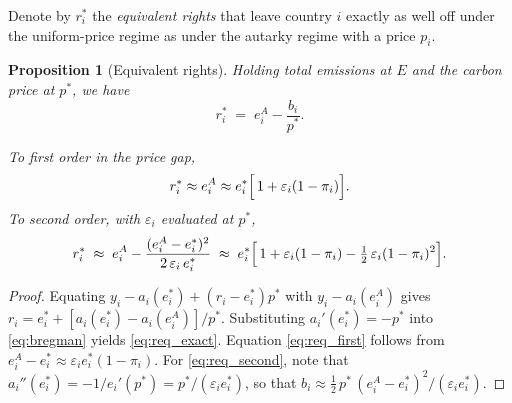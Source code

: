\documentclass[12pt,english]{article}
\newtheorem{proposition}{Proposition}
\theoremstyle{remark}
\begin{document}
Denote by $r^*_i$ the \textit{equivalent rights} that leave country $i$ exactly as well off under the uniform-price regime as under the autarky regime with a price $p_i$. 
\begin{proposition}[Equivalent rights]\label{prop:equiv}
Holding total emissions at $E$ and the carbon price at $p^*$, we have
\begin{equation}
  r^*_i \;=\; e^A_i - \frac{b_i}{p^*}. 
  \label{eq:req_exact}
\end{equation}

To first order in the price gap, 
\begin{equation}
  r^*_i \approx e^A_i \approx e^*_i\Bigl[\,1+\varepsilon_i(1-\pi_i)\Bigr].
    \label{eq:req_first}
\end{equation}
To second order, with $\varepsilon_i$ evaluated at $p^*$,
\begin{equation}
  r^*_i \;\approx\; e^A_i - \frac{(e^A_i-e^*_i)^2}{2\,\varepsilon_i\,e^*_i}
  \;\approx\; e^*_i\Bigl[\,1+\varepsilon_i(1-\pi_i)-\tfrac12\,\varepsilon_i(1-\pi_i)^2\Bigr].
  \label{eq:req_second}
\end{equation}
\end{proposition}

\begin{proof}
Equating $y_i-a_i(e^*_i)+(r_i-e^*_i)p^*$ with $y_i-a_i(e^A_i)$ gives $r_i=e^*_i+[a_i(e^*_i)-a_i(e^A_i)]/p^*$. Substituting $a_i'(e^*_i)=-p^*$ into \eqref{eq:bregman} yields \eqref{eq:req_exact}. Equation \eqref{eq:req_first} follows from $e^A_i-e^*_i\approx\varepsilon_i e^*_i(1-\pi_i)$. For \eqref{eq:req_second}, note that $a_i''(e^*_i)=-1/e_i'(p^*)=p^*/(\varepsilon_i e^*_i)$, so that $b_i\approx \tfrac12\,p^*\,(e^A_i-e^*_i)^2/(\varepsilon_i e^*_i)$. 
\end{proof}
\end{document}
